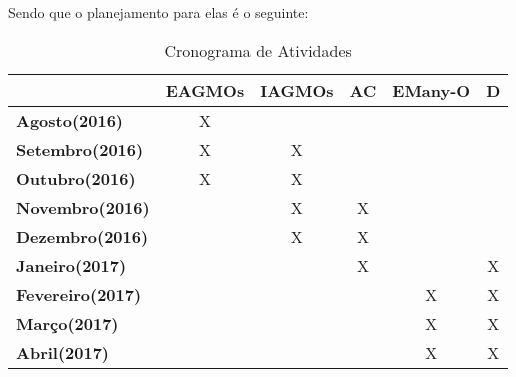 \documentclass[12pt, %
openright, 
oneside, %
a4paper,    %
brazil]{facom-ufu-abntex2}
\begin{document}
	Sendo que o planejamento para elas é o seguinte:
	
	\begin{table}[!h]
	\centering
	\caption{Cronograma de Atividades}
	\begin{tabular}{|l|c|c|c|c|c|}
	\hline
	\multicolumn{1}{|c|}{\textbf{}} & \textbf{EAGMOs} & \multicolumn{1}{l|}{\textbf{IAGMOs}} & \multicolumn{1}{l|}{\textbf{AC}} & \multicolumn{1}{l|}{\textbf{EMany-O}} & \multicolumn{1}{l|}{\textbf{D}} \\ \hline
	\textbf{Agosto(2016)}           & X               &                                      &                                  &                                       &                                 \\ \hline
	\textbf{Setembro(2016)}         & X               & X                                    &                                  &                                       &                                 \\ \hline
	\textbf{Outubro(2016)}          & X               & X                                    &                                  &                                       &                                 \\ \hline
	\textbf{Novembro(2016)}         & \textbf{}       & X                                    & X                                &                                       &                                 \\ \hline
	\textbf{Dezembro(2016)}         & \textbf{}       & X                                    & X                                &                                       &                                 \\ \hline
	\textbf{Janeiro(2017)}          & \textbf{}       &                                      & X                                &                                       & X                               \\ \hline
	\textbf{Fevereiro(2017)}        & \textbf{}       &                                      &                                  & X                                     & X                               \\ \hline
	\textbf{Março(2017)}            & \textbf{}       &                                      &                                  & X                                     & X                               \\ \hline
	\textbf{Abril(2017)}                  &                 &                                      &                                  & X                                     & X                               \\ \hline

\end{tabular}
\end{table}
\end{document}

